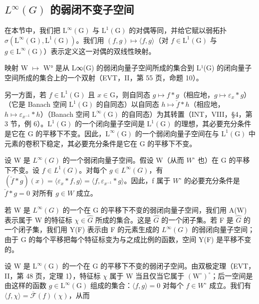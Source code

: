 \subsection{\texorpdfstring{\(L^{\infty}(G)\) 的弱闭不变子空间}{L\^{}\{\textbackslash infinity\}(G) 的弱闭不变子空间}}

在本节中，我们把 \(\mathrm{L}^{\infty}(\mathrm{G})\) 与 \(\mathrm{L}^{1}(\mathrm{G})\) 的对偶等同，并给它赋以弱拓扑 \(\sigma(\mathrm{L}^{\infty}(\mathrm{G}),\mathrm{L}^{1}(\mathrm{G}))\)。我们用 \((f,g)\mapsto\langle f,g\rangle\)（对 \(f\in\mathrm{L}^{1}(\mathrm{G})\) 与 \(g\in\mathrm{L}^{\infty}(\mathrm{G})\)）表示定义这一对偶的双线性映射。

映射 W \(\mapsto\) W° 是从 L∞(G) 的弱闭向量子空间所成的集合到 L¹(G) 的闭向量子空间所成的集合上的一个双射（EVT，II，第 55 页，命题 10）。

另一方面，若 \(f \in \mathrm{L}^1(\mathrm{G})\) 且 \(x \in \mathrm{G}\)，则自同态 \(g \mapsto f * g\)（相应地，\(g \mapsto \varepsilon_x * g\)）（它是 Banach 空间 \(\mathrm{L}^1(\mathrm{G})\) 的自同态）以自同态 \(h \mapsto \check{f} * h\)（相应地，\(h \mapsto \varepsilon_{x^{-1}} * h\)）（Banach 空间 \(\mathrm{L}^\infty(\mathrm{G})\) 的自同态）为其转置（INT，VIII，§4，第 3 节，例 6）。\(\mathrm{L}^1(\mathrm{G})\) 的一个闭向量子空间是 \(\mathrm{L}^1(\mathrm{G})\) 的理想，其必要充分条件是它在 G 的平移下不变。因此，\(\mathrm{L}^\infty(\mathrm{G})\) 的一个弱闭向量子空间在与 \(\mathrm{L}^1(\mathrm{G})\) 中元素的卷积下稳定，其必要充分条件是它在 G 的平移下不变。

设 W 是 \(L^{\infty}(G)\) 的一个弱闭向量子空间。假设 W（从而 \(W^{\circ}\) 也）在 G 的平移下不变。设 \(f \in L^{1}(G)\)。对每个 \(g \in L^{\infty}(G)\)，有 \((\check{f} * g)(x) = \langle \varepsilon_{x} * f, g \rangle = \langle f, \varepsilon_{x^{-1}} * g \rangle\)。因此，f 属于 \(W^{\circ}\) 的必要充分条件是 \(\check{f} * g = 0\) 对所有 \(g \in W\) 成立。

若 W 是 \(L^{\infty}(G)\) 的一个在 G 的平移下不变的弱闭向量子空间，我们用 A(W) 表示属于 W 的特征标 \(\chi \in \widehat{G}\) 所成的集合。这是 \(\widehat{G}\) 的一个闭子集。若 F 是 \(\widehat{G}\) 的一个闭子集，我们用 Y(F) 表示由 F 的元素生成的 \(L^{\infty}(G)\) 的弱闭向量子空间；由于 G 的每个平移把每个特征标变为与之成比例的函数，空间 Y(F) 是平移不变的。

设 W 是 \(\mathrm{L}^{\infty}(\mathrm{G})\) 的一个在 G 的平移下不变的弱闭子空间。由双极定理（EVT，II，第 48 页，定理 1），特征标 \(\chi\) 属于 W 当且仅当它属于 \((\mathrm{W}^{\circ})^{\circ}\)；后一空间是由这样的函数 \(g \in \mathrm{L}^{\infty}(\mathrm{G})\) 组成的集合：\(\langle f, g \rangle = 0\) 对每个 \(f \in W^{\circ}\) 成立。我们有 \(\langle f, \chi \rangle = \overline{\mathcal{F}}(f)(\chi)\)，从而

